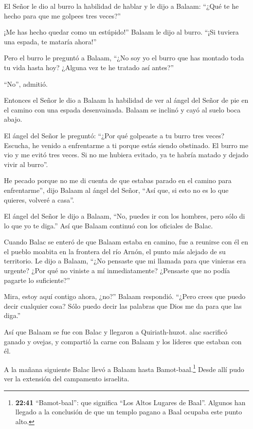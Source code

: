  El Señor le dio al burro la habilidad de hablar y le dijo
a Balaam: ``¿Qué te he hecho para que me golpees tres veces?''

 ¡Me has hecho quedar como un estúpido!'' Balaam le dijo al
burro. ``¡Si tuviera una espada, te mataría ahora!''

 Pero el burro le preguntó a Balaam, ``¿No soy yo el burro
que has montado toda tu vida hasta hoy? ¿Alguna vez te he tratado así
antes?''

``No'', admitió.

 Entonces el Señor le dio a Balaam la habilidad de ver al
ángel del Señor de pie en el camino con una espada desenvainada. Balaam
se inclinó y cayó al suelo boca abajo.

 El ángel del Señor le preguntó: ``¿Por qué golpeaste a tu
burro tres veces? Escucha, he venido a enfrentarme a ti porque estás
siendo obstinado.  El burro me vio y me evitó tres veces.
Si no me hubiera evitado, ya te habría matado y dejado vivir al burro''.

 He pecado porque no me di cuenta de que estabas parado en
el camino para enfrentarme'', dijo Balaam al ángel del Señor, ``Así que,
si esto no es lo que quieres, volveré a casa''.

 El ángel del Señor le dijo a Balaam, ``No, puedes ir con
los hombres, pero sólo di lo que yo te diga.'' Así que Balaam continuó
con los oficiales de Balac.

 Cuando Balac se enteró de que Balaam estaba en camino, fue
a reunirse con él en el pueblo moabita en la frontera del río Arnón, el
punto más alejado de su territorio.  Le dijo a Balaam,
``¿No pensaste que mi llamada para que vinieras era urgente? ¿Por qué no
viniste a mí inmediatamente? ¿Pensaste que no podía pagarte lo
suficiente?''

 Mira, estoy aquí contigo ahora, ¿no?'' Balaam respondió.
``¿Pero crees que puedo decir cualquier cosa? Sólo puedo decir las
palabras que Dios me da para que las diga.''

 Así que Balaam se fue con Balac y llegaron a
Quiriath-huzot.  alac sacrificó ganado y ovejas, y
compartió la carne con Balaam y los líderes que estaban con él.

 A la mañana siguiente Balac llevó a Balaam hasta
Bamot-baal.\footnote{\textbf{22:41} ``Bamot-baal'': que significa ``Los
  Altos Lugares de Baal''. Algunos han llegado a la conclusión de que un
  templo pagano a Baal ocupaba este punto alto.} Desde allí pudo ver la
extensión del campamento israelita.

